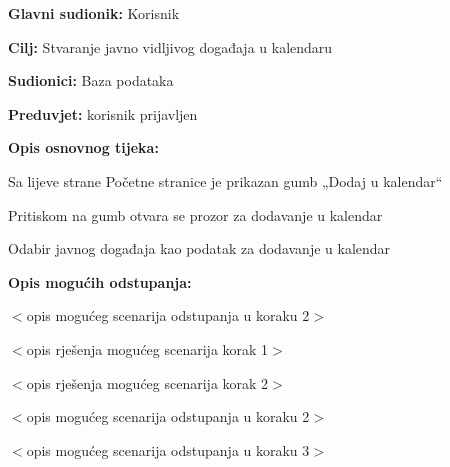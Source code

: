 				\noindent {}
			\begin{packed_item}
				
				\item \textbf{Glavni sudionik: }Korisnik
				\item  \textbf{Cilj:} Stvaranje javno vidljivog događaja u kalendaru
				\item  \textbf{Sudionici:}
				Baza podataka
				\item  \textbf{Preduvjet:} korisnik prijavljen
				\item  \textbf{Opis osnovnog tijeka:}
				
				\item[] \begin{packed_enum}
					
					\item	Sa lijeve strane Početne stranice je prikazan gumb „Dodaj u kalendar“
					\item Pritiskom na gumb otvara se prozor za dodavanje u kalendar
					\item	Odabir javnog događaja kao podatak za dodavanje u kalendar
					
				\end{packed_enum}
				
				\item  \textbf{Opis mogućih odstupanja:}
				
				\item[] \begin{packed_item}
					
					\item[2.a] $<$opis mogućeg scenarija odstupanja u koraku 2$>$
					\item[] \begin{packed_enum}
						
						\item $<$opis rješenja mogućeg scenarija korak 1$>$
						\item $<$opis rješenja mogućeg scenarija korak 2$>$
						
					\end{packed_enum}
					\item[2.b] $<$opis mogućeg scenarija odstupanja u koraku 2$>$
					\item[3.a] $<$opis mogućeg scenarija odstupanja  u koraku 3$>$
					
				\end{packed_item}
			\end{packed_item}
		
